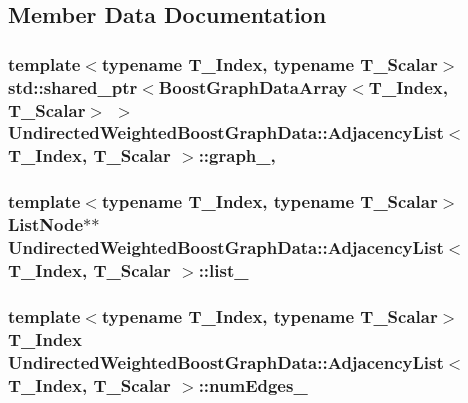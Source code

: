 \subsection{Member Data Documentation}
\hypertarget{class_undirected_weighted_graph_1_1_adjacency_list_a9fa1388a2f0ec3c1428da65604290bdf}{
\subsubsection[{graph\+\_\+}]{\setlength{\rightskip}{0pt plus 5cm}template$<$typename T\+\_\+\+Index, typename T\+\_\+\+Scalar$>$ std\+::shared\+\_\+ptr$<${\bf BoostGraphData\+Array}$<$T\+\_\+\+Index, T\+\_\+\+Scalar$>$ $>$ {\bf Undirected\+Weighted\+BoostGraphData\+::\+Adjacency\+List}$<$ T\+\_\+\+Index, T\+\_\+\+Scalar $>$\+::graph\+\_\+\hspace{0.3cm}{\ttfamily [mutable]}, {\ttfamily [private]}}}\label{class_undirected_weighted_graph_1_1_adjacency_list_a9fa1388a2f0ec3c1428da65604290bdf}
\hypertarget{class_undirected_weighted_graph_1_1_adjacency_list_a6e46162121cb122f3ba430c7a2528cac}{
\subsubsection[{list\+\_\+}]{\setlength{\rightskip}{0pt plus 5cm}template$<$typename T\+\_\+\+Index, typename T\+\_\+\+Scalar$>$ {\bf List\+Node}$\ast$$\ast$ {\bf Undirected\+Weighted\+BoostGraphData\+::\+Adjacency\+List}$<$ T\+\_\+\+Index, T\+\_\+\+Scalar $>$\+::list\+\_\+\hspace{0.3cm}{\ttfamily [private]}}}\label{class_undirected_weighted_graph_1_1_adjacency_list_a6e46162121cb122f3ba430c7a2528cac}
\hypertarget{class_undirected_weighted_graph_1_1_adjacency_list_a383bf107a02d24417f668c9cb175959f}{
\subsubsection[{num\+Edges\+\_\+}]{\setlength{\rightskip}{0pt plus 5cm}template$<$typename T\+\_\+\+Index, typename T\+\_\+\+Scalar$>$ T\+\_\+\+Index {\bf Undirected\+Weighted\+BoostGraphData\+::\+Adjacency\+List}$<$ T\+\_\+\+Index, T\+\_\+\+Scalar $>$\+::num\+Edges\+\_\+\hspace{0.3cm}{\ttfamily [private]}}}\label{class_undirected_weighted_graph_1_1_adjacency_list_a383bf107a02d24417f668c9cb175959f}
